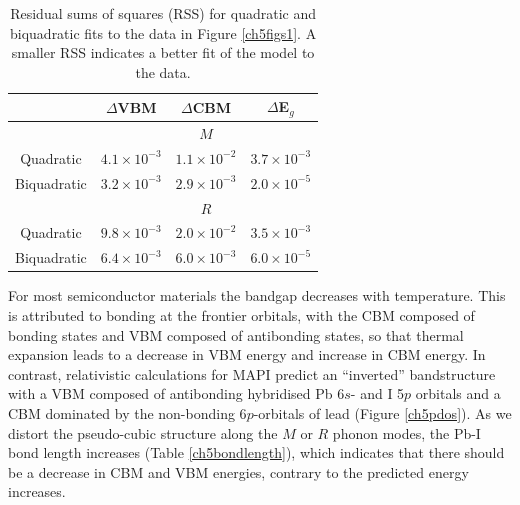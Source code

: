 \begin{table}[ht] \centering
 \caption[Residual sum of squares for quadratic and bi-quadratic fits to calculated bandgaps] {Residual sums of squares (RSS) for quadratic and biquadratic fits to the data in Figure \ref{ch5figs1}. A smaller RSS indicates a better fit of the model to the data.}
  \label{RSS} 
 \begin{tabular}{cccc} 
 \toprule
 
  \multicolumn{1}{c}{} & $\Delta$VBM & $\Delta$CBM & $\Delta$E$_g$ \\
  \midrule
 \multicolumn{1}{c}{} & \multicolumn{3}{c}{$M$} \\

 Quadratic & $4.1 \times 10^{-3}$ & $ 1.1 \times 10^{-2}$ & $3.7 \times 10^{-3}$ \\

 Biquadratic & $3.2 \times 10^{-3}$ & $2.9 \times 10^{-3}$ & $2.0 \times 10^{-5}$ \\

 \midrule
 
  \multicolumn{1}{c}{} & \multicolumn{3}{c}{$R$} \\

 Quadratic &   $9.8 \times 10^{-3}$& $2.0 \times 10^{-2}$& $3.5 \times 10^{-3}$\\

 Biquadratic & $6.4 \times 10^{-3}$ &$6.0 \times 10^{-3}$ & $6.0 \times 10^{-5}$\\
 
 \bottomrule
 \end{tabular}
 \end{table}

For most semiconductor materials the bandgap decreases with temperature. This is attributed to bonding at the frontier orbitals, with the CBM composed of bonding states and VBM composed of antibonding states, so that thermal expansion leads to a decrease in VBM energy and increase in CBM energy.\autocite{Francisco2019}
In contrast, relativistic calculations for MAPI predict an ``inverted'' bandstructure with a VBM composed of antibonding hybridised Pb 6$s$- and I 5$p$ orbitals and a CBM dominated by the non-bonding 6$p$-orbitals of lead (Figure \ref{ch5pdos}).\autocite{Brivio2013}
As we distort the pseudo-cubic structure along the $M$ or $R$ phonon modes, the Pb-I bond length increases (Table \ref{ch5bondlength}), which indicates that there should be a decrease in CBM and VBM energies, contrary to the predicted energy increases.

